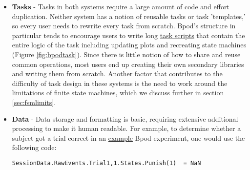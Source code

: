 \begin{itemize}[resume*, before=\vspace{0pt}, after=\vspace{\baselineskip}]%
    \item \textbf{Tasks} - Tasks in both systems require a large amount of code and effort duplication. Neither system has a notion of reusable tasks or task 'templates,' so every user needs to rewrite every task from scratch. Bpod's structure in particular tends to encourage users to write long \href{https://github.com/sanworks/Bpod_Gen2/blob/df6cd0c7d5df8247b02077b05fc263f79b86b096/Examples/Protocols/Sound/AnalogSound2AFC/AnalogSound2AFC.m}{task scripts} that contain the entire logic of the task including updating plots and recreating state machines (Figure \ref{fig:bpodtask}). Since there is little notion of how to share and reuse common operations, most users end up creating their own secondary libraries and writing them from scratch. Another factor that contributes to the difficulty of task design in these systems is the need to work around the limitations of finite state machines, which we discuss further in section \ref{sec:fsmlimits}.
    \item \textbf{Data} - Data storage and formatting is basic, requiring extensive additional processing to make it human readable. For example, to determine whether a subject got a trial correct in an \href{https://github.com/sanworks/Bpod_Gen2/blob/master/Examples/Protocols/Light/Light2AFC/Light2AFC.m}{example} Bpod experiment, one would use the following code:
    
    \texttt{SessionData.RawEvents.Trial{1,1}.States.Punish(1) ~= NaN}
    

\end{itemize}
